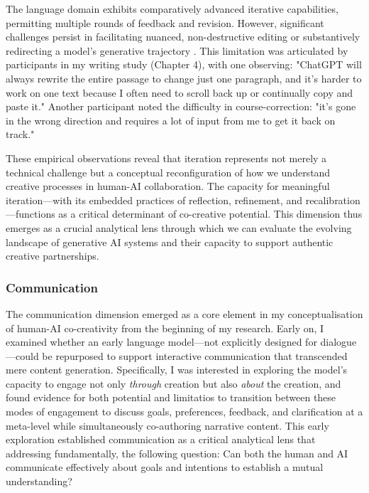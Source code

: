 The language domain exhibits comparatively advanced iterative capabilities, permitting multiple rounds of feedback and revision. However, significant challenges persist in facilitating nuanced, non-destructive editing or substantively redirecting a model's generative trajectory \cite{Bown2024-yx}. This limitation was articulated by participants in my writing study (Chapter 4), with one observing: "ChatGPT will always rewrite the entire passage to change just one paragraph, and it's harder to work on one text because I often need to scroll back up or continually copy and paste it." Another participant noted the difficulty in course-correction: "it's gone in the wrong direction and requires a lot of input from me to get it back on track."

These empirical observations reveal that iteration represents not merely a technical challenge but a conceptual reconfiguration of how we understand creative processes in human-AI collaboration. The capacity for meaningful iteration—with its embedded practices of reflection, refinement, and recalibration—functions as a critical determinant of co-creative potential. This dimension thus emerges as a crucial analytical lens through which we can evaluate the evolving landscape of generative AI systems and their capacity to support authentic creative partnerships.

\subsubsection{Communication}

The communication dimension emerged as a core element in my conceptualisation of human-AI co-creativity from the beginning of my research. Early on, I examined whether an early language model—not explicitly designed for dialogue—could be repurposed to support interactive communication that transcended mere content generation. Specifically, I was interested in exploring the model's capacity to engage not only \textit{through} creation but also \textit{about} the creation, and found evidence for both potential and limitatios to transition between these modes of engagement to discuss goals, preferences, feedback, and clarification at a meta-level while simultaneously co-authoring narrative content. This early exploration established communication as a critical analytical lens that addressing fundamentally, the following question: Can both the human and AI communicate effectively about goals and intentions to establish a mutual understanding?

